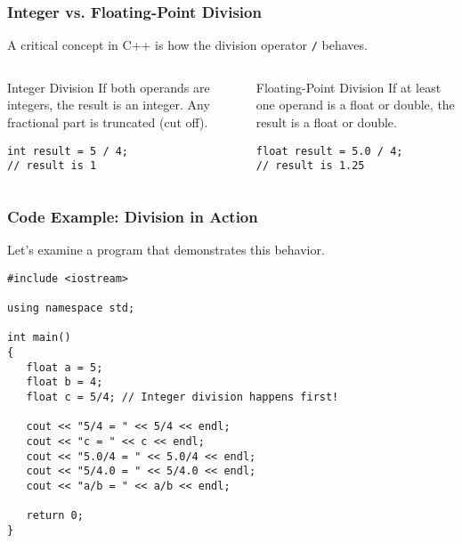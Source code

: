 \documentclass{beamer}
\begin{document}
\begin{frame}[fragile]
\frametitle{Integer vs. Floating-Point Division}
A critical concept in C++ is how the division operator \texttt{/} behaves.

\begin{columns}
\begin{block}{Integer Division}
If \alert{both} operands are integers, the result is an integer. Any fractional part is \alert{truncated} (cut off).
\begin{verbatim}
int result = 5 / 4;
// result is 1
\end{verbatim}
\end{block}

\begin{block}{Floating-Point Division}
If \alert{at least one} operand is a float or double, the result is a float or double.
\begin{verbatim}
float result = 5.0 / 4;
// result is 1.25
\end{verbatim}
\end{block}
\end{columns}
\end{frame}

\begin{frame}[fragile]
\frametitle{Code Example: Division in Action}
Let's examine a program that demonstrates this behavior.
\begin{verbatim}
#include <iostream>

using namespace std;

int main()
{
   float a = 5;
   float b = 4;
   float c = 5/4; // Integer division happens first!

   cout << "5/4 = " << 5/4 << endl;
   cout << "c = " << c << endl;
   cout << "5.0/4 = " << 5.0/4 << endl;
   cout << "5/4.0 = " << 5/4.0 << endl;
   cout << "a/b = " << a/b << endl;

   return 0;
}
\end{verbatim}
\end{frame}
\end{document}
